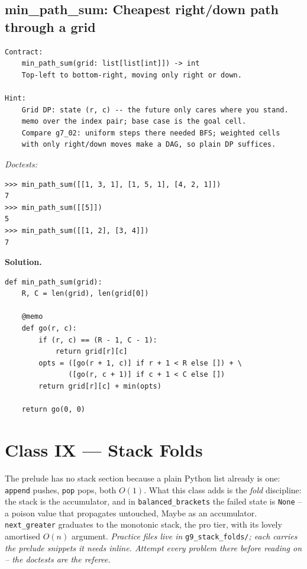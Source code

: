 \documentclass[11pt,letterpaper]{book}
\begin{document}
\section{min\_path\_sum: Cheapest right/down path through a grid}
\begin{lstlisting}[style=spec]
Contract:
    min_path_sum(grid: list[list[int]]) -> int
    Top-left to bottom-right, moving only right or down.

Hint:
    Grid DP: state (r, c) -- the future only cares where you stand.
    memo over the index pair; base case is the goal cell.
    Compare g7_02: uniform steps there needed BFS; weighted cells
    with only right/down moves make a DAG, so plain DP suffices.
\end{lstlisting}
\noindent\textit{Doctests:}
\begin{lstlisting}[style=spec]
>>> min_path_sum([[1, 3, 1], [1, 5, 1], [4, 2, 1]])
7
>>> min_path_sum([[5]])
5
>>> min_path_sum([[1, 2], [3, 4]])
7
\end{lstlisting}
\noindent\textbf{Solution.}
\begin{lstlisting}[style=code]
def min_path_sum(grid):
    R, C = len(grid), len(grid[0])

    @memo
    def go(r, c):
        if (r, c) == (R - 1, C - 1):
            return grid[r][c]
        opts = ([go(r + 1, c)] if r + 1 < R else []) + \
               ([go(r, c + 1)] if c + 1 < C else [])
        return grid[r][c] + min(opts)

    return go(0, 0)
\end{lstlisting}
\chapter{Class IX --- Stack Folds}

The prelude has no stack section because a plain Python list already is one:
\texttt{append} pushes, \texttt{pop} pops, both $O(1)$. What this class adds is
the \emph{fold} discipline: the stack is the accumulator, and in
\texttt{balanced\_brackets} the failed state is \texttt{None} -- a poison value
that propagates untouched, Maybe as an accumulator. \texttt{next\_greater}
graduates to the monotonic stack, the pro tier, with its lovely amortised
$O(n)$ argument.
\medskip\noindent\textit{Practice files live in }\texttt{g9\_stack\_folds/}\textit{;
each carries the prelude snippets it needs inline. Attempt every problem there
before reading on -- the doctests are the referee.}
\end{document}
